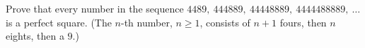 Prove that every number in the sequence $4489,\ 444889,\ 44448889,\ 4444488889,\ \dots$ is a perfect square. (The $n$-th number, $n\ge1$, consists of $n+1$ fours, then $n$ eights, then a $9$.)
